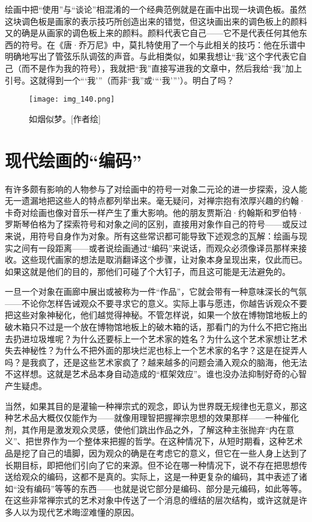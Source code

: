 绘画中把“使用”与“谈论”相混淆的一个经典范例就是在画中出现一块调色板。虽然这块调色板是画家的表示技巧所创造出来的错觉，但这块画出来的调色板上的颜料又的确是从画家的调色板上来的颜料。颜料代表它自己——它不是代表任何其他东西的符号。在《唐·乔万尼》中，莫扎特使用了一个与此相关的技巧：他在乐谱中明确地写出了管弦乐队调弦的声音。与此相类似，如果我想让“我”这个字代表它自己（而不是作为我的符号），我就把“我”直接写进我的文章中，然后我给“我”加上引号。这就得到一个“‘我’”（而非“我”或‘“‘我’”’）。明白了吗？

\begin{figure}
\texttt{[image: img\_140.png]}
\caption[如烟似梦。]
  {如烟似梦。[作者绘] }
\end{figure}

\section{现代绘画的“编码”}

有许多颇有影响的人物参与了对绘画中的符号一对象二元论的进一步探索，没人能无一遗漏地把这些人的特点都列举出来。毫无疑问，对禅宗抱有浓厚兴趣的约翰·卡奇对绘画也像对音乐一样产生了重大影响。他的朋友贾斯泊·约翰斯和罗伯特·罗斯琴伯格为了探索符号和对象之间的区别，直接用对象作自己的符号——或反过来说，用符号自身作为对象。所有这些常识都可能导致下述观念的瓦解：绘画与现实之间有一段距离——或者说绘画通过“编码”来说话，而观众必须像译员那样来接收。这些现代画家的想法是取消翻译这个步骤，让对象本身呈现出来，仅此而已。如果这就是他们的目的，那他们可碰了个大钉子，而且这可能是无法避免的。

一旦一个对象在画廊中展出或被称为一件“作品”，它就会带有一种意味深长的气氛——不论你怎样告诫观众不要寻求它的意义。实际上事与愿违，你越告诉观众不要把这些对象神秘化，他们越觉得神秘。不管怎样说，如果一个放在博物馆地板上的破木箱只不过是一个放在博物馆地板上的破木箱的话，那看门的为什么不把它拖出去扔进垃圾堆呢？为什么还要标上一个艺术家的姓名？为什么这个艺术家想让艺术失去神秘性？为什么不把外面的那块烂泥也标上一个艺术家的名字？这是在捉弄人吗？是我疯了，还是这些艺术家疯了？越来越多的问题会涌入观众的脑海，他无法不这样想。这就是艺术品本身自动造成的“框架效应”。谁也没办法抑制好奇的心智产生疑虑。

当然，如果其目的是灌输一种禅宗式的观念，即认为世界既无规律也无意义，那这种艺术品大概仅仅能作为——就像用理智把握禅宗思想的效果那样——一种催化剂，其作用是激发观众灵感，使他们跳出作品之外，了解这种主张抛弃“内在意义”、把世界作为一个整体来把握的哲学。在这种情况下，从短时期看，这种艺术品是挖了自己的墙脚，因为观众的确是在考虑它的意义，但它在一些人身上达到了长期目标，即把他们引向了它的来源。但不论在哪一种情况下，说不存在把思想传送给观众的编码，这都不是真的。实际上，这是一种更复杂的编码，其中表述了诸如“没有编码”等等的东西——也就是说它部分是编码、部分是元编码，如此等等。在这些非常禅宗式的艺术对象中传送了一个消息的缠结的层次结构，或许这就是许多人以为现代艺术晦涩难懂的原因。

